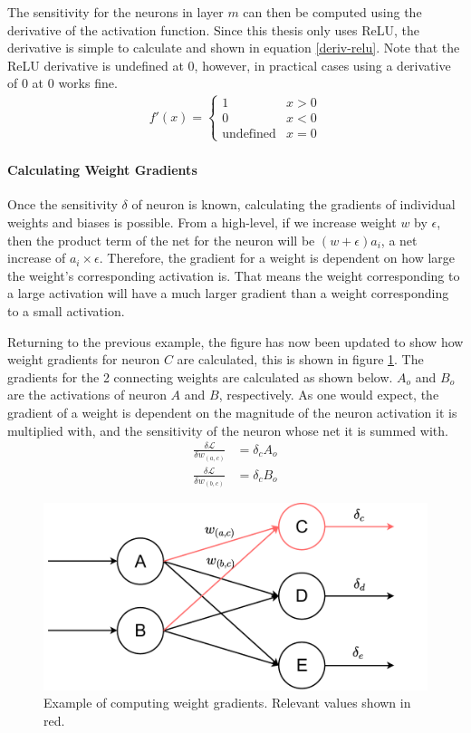 The sensitivity for the neurons in layer $m$ can then be computed using the derivative of the activation function. Since this thesis only uses ReLU, the derivative is simple to calculate and shown in equation \ref{deriv-relu}. Note that the ReLU derivative is undefined at 0, however, in practical cases using a derivative of 0 at 0 works fine.
\begin{align}
f'(x) = \begin{cases}
	1 & x > 0\\
	0 & x < 0\\
	\text{undefined} & x = 0
\end{cases}\label{deriv-relu}
\end{align}


\paragraph{Calculating Weight Gradients}
Once the sensitivity $\delta$ of neuron is known, calculating the gradients of individual weights and biases is possible. From a high-level, if we increase weight $w$ by $\epsilon$, then the product term of the net for the neuron will be $(w + \epsilon)a_i$, a net increase of $a_i\times\epsilon$. Therefore, the gradient for a weight is dependent on how large the weight's corresponding activation is. That means the weight corresponding to a large activation will have a much larger gradient than a weight corresponding to a small activation.

Returning to the previous example, the figure has now been updated to show how weight gradients for neuron $C$ are calculated, this is shown in figure \ref{weight-bp}. The gradients for the 2 connecting weights are calculated as shown below. $A_o$ and $B_o$ are the activations of neuron $A$ and $B$, respectively. As one would expect, the gradient of a weight is dependent on the magnitude of the neuron activation it is multiplied with, and the sensitivity of the neuron whose net it is summed with.
\begin{align*}
\frac{\delta \mathcal{L}}{\delta w_{(a,c)}} &= \delta_cA_o\\
\frac{\delta \mathcal{L}}{\delta w_{(b,c)}} &= \delta_cB_o
\end{align*}
\begin{figure}
	\centering 
	\includegraphics[width=\textwidth]{figures/weight_bp.pdf}
	\caption{Example of computing weight gradients. Relevant values shown in red.} \label{weight-bp}
\end{figure}

